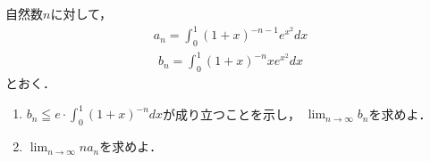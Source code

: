 \documentclass[../../main.tex]{subfiles}
\begin{document}
自然数$n$に対して，
\begin{align*}
  a_n=\int_0^1{(1+x)}^{-n-1}e^{x^2}dx
\end{align*}
\begin{align*}
  b_n=\int_0^1{(1+x)}^{-n}xe^{x^2}dx
\end{align*}
とおく．
\begin{enumerate}
  \item $\displaystyle b_n \leqq e\cdot\int_0^1{(1+x)}^{-n}dx$が成り立つことを示し，
    $\displaystyle\lim_{n\to\infty}b_n$を求めよ．
  \item $\displaystyle\lim_{n\to\infty}na_n$を求めよ．
\end{enumerate}
\end{document}
